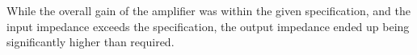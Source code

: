 \documentclass[a4paper,11pt]{article}
\begin{document}
    While the overall gain of the amplifier was within the given specification, and the input impedance exceeds the specification, the output impedance ended up being significantly higher than required.





\end{document}
